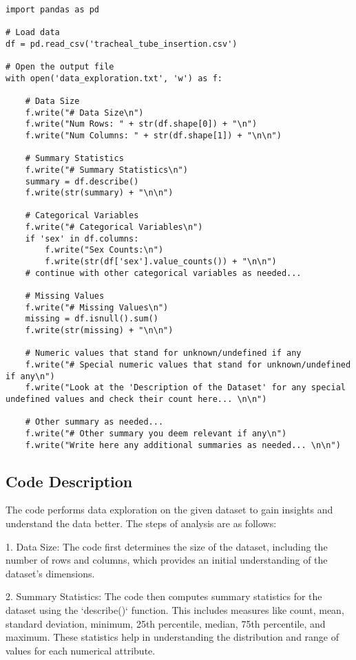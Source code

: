 \documentclass[11pt]{article}
\begin{document}
\begin{verbatim}

import pandas as pd

# Load data
df = pd.read_csv('tracheal_tube_insertion.csv')

# Open the output file
with open('data_exploration.txt', 'w') as f:

    # Data Size
    f.write("# Data Size\n")
    f.write("Num Rows: " + str(df.shape[0]) + "\n")
    f.write("Num Columns: " + str(df.shape[1]) + "\n\n")

    # Summary Statistics
    f.write("# Summary Statistics\n")
    summary = df.describe()
    f.write(str(summary) + "\n\n")

    # Categorical Variables
    f.write("# Categorical Variables\n")
    if 'sex' in df.columns:
        f.write("Sex Counts:\n")
        f.write(str(df['sex'].value_counts()) + "\n\n")
    # continue with other categorical variables as needed...

    # Missing Values
    f.write("# Missing Values\n")
    missing = df.isnull().sum()
    f.write(str(missing) + "\n\n")
    
    # Numeric values that stand for unknown/undefined if any
    f.write("# Special numeric values that stand for unknown/undefined if any\n")
    f.write("Look at the 'Description of the Dataset' for any special undefined values and check their count here... \n\n")

    # Other summary as needed...
    f.write("# Other summary you deem relevant if any\n")
    f.write("Write here any additional summaries as needed... \n\n")

\end{verbatim}

\subsection{Code Description}

The code performs data exploration on the given dataset to gain insights and understand the data better. The steps of analysis are as follows:

1. Data Size: The code first determines the size of the dataset, including the number of rows and columns, which provides an initial understanding of the dataset's dimensions.

2. Summary Statistics: The code then computes summary statistics for the dataset using the `describe()` function. This includes measures like count, mean, standard deviation, minimum, 25th percentile, median, 75th percentile, and maximum. These statistics help in understanding the distribution and range of values for each numerical attribute.
\end{document}
